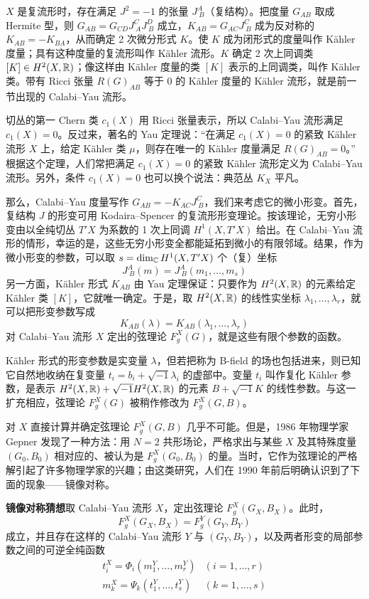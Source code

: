 $X$ 是复流形时，存在满足 $J^2=-1$ 的张量 $J^A_{\ B}$（复结构）。把度量 $G_{AB}$ 取成 Hermite 型，则 $G_{AB}=G_{CD}J^C_{\ A}J^D_{\ B}$ 成立，$K_{AB}=G_{AC}J^C_{\ B}$ 成为反对称的 $K_{AB}=-K_{BA}$，从而确定 2 次微分形式 $K$。使 $K$ 成为闭形式的度量叫作 Kähler 度量；具有这种度量的复流形叫作 Kähler 流形。$K$ 确定 2 次上同调类 $[K]\in H^2(X,\mathbb{R})$；像这样由 Kähler 度量的类 $[K]$ 表示的上同调类，叫作 Kähler 类。带有 Ricci 张量 $R(G)_{AB}$ 等于 0 的 Kähler 度量的 Kähler 流形，就是前一节出现的 Calabi--Yau 流形。

切丛的第一 Chern 类 $c_1(X)$ 用 Ricci 张量表示，所以 Calabi--Yau 流形满足 $c_1(X)=0$。反过来，著名的 Yau 定理说：“在满足 $c_1(X)=0$ 的紧致 Kähler 流形 $X$ 上，给定 Kähler 类 $\mu$，则存在唯一的 Kähler 度量满足 $R(G)_{AB}=0$。”
根据这个定理，人们常把满足 $c_1(X)=0$ 的紧致 Kähler 流形定义为 Calabi--Yau 流形。另外，条件 $c_1(X)=0$ 也可以换个说法：典范丛 $K_X$ 平凡。

那么，Calabi--Yau 度量写作 $G_{AB}=-K_{AC}J^C_{\ B}$，我们来考虑它的微小形变。首先，复结构 $J$ 的形变可用 Kodaira--Spencer 的复流形形变理论。按该理论，无穷小形变由以全纯切丛 $T'X$ 为系数的 1 次上同调 $H^1(X,T'X)$ 给出。在 Calabi--Yau 流形的情形，幸运的是，这些无穷小形变全都能延拓到微小的有限邻域。结果，作为微小形变的参数，可以取 $s=\dim_{\mathbb{C}}H^1(X,T'X)$ 个（复）坐标
\[
  J^A_{\ B}(m)=J^A_{\ B}(m_1,\dots,m_s)
\]
另一方面，Kähler 形式 $K_{AB}$ 由 Yau 定理保证：只要作为 $H^2(X,\mathbb{R})$ 的元素给定 Kähler 类 $[K]$，它就唯一确定。于是，取 $H^2(X,\mathbb{R})$ 的线性实坐标 $\lambda_1,\dots,\lambda_r$，就可以把形变参数写成
\[
  K_{AB}(\lambda)=K_{AB}(\lambda_1,\dots,\lambda_r)
\]
对 Calabi--Yau 流形 $X$ 定出的弦理论 $F_g^X(G)$，就是这些有限个参数的函数。

Kähler 形式的形变参数是实变量 $\lambda$，但若把称为 B-field 的场也包括进来，则已知它自然地收纳在复变量 $t_i=b_i+\sqrt{-1}\lambda_i$ 的虚部中。变量 $t_i$ 叫作复化 Kähler 参数，是表示 $H^2(X,\mathbb{R})+\sqrt{-1}H^2(X,\mathbb{R})$ 的元素 $B+\sqrt{-1}K$ 的线性参数。与这一扩充相应，弦理论 $F_g^X(G)$ 被稍作修改为 $F_g^X(G,B)$。

对 $X$ 直接计算并确定弦理论 $F_g^X(G,B)$ 几乎不可能。但是，1986 年物理学家 Gepner 发现了一种方法：用 $N=2$ 共形场论，严格求出与某些 $X$ 及其特殊度量 $(G_0,B_0)$ 相对应的、被认为是 $F_g^X(G_0,B_0)$ 的量。当时，它作为弦理论的严格解引起了许多物理学家的兴趣；由这类研究，人们在 1990 年前后明确认识到了下面的现象——镜像对称。

\noindent\textbf{镜像对称猜想}\quad 取 Calabi--Yau 流形 $X$，定出弦理论 $F_g^X(G_X,B_X)$。此时，
\begin{equation}
  F_g^X(G_X,B_X)=F_g^Y(G_Y,B_Y)
  \tag{4}
\end{equation}
成立，并且存在这样的 Calabi--Yau 流形 $Y$ 与 $(G_Y,B_Y)$，以及两者形变的局部参数之间的可逆全纯函数
\begin{equation}
\begin{array}{ll}
  t_i^X=\Phi_i(m_1^Y,\dots,m_r^Y) & (i=1,\dots,r)\\[2pt]
  m_k^X=\Psi_k(t_1^Y,\dots,t_s^Y) & (k=1,\dots,s)
\end{array}
\tag{5}
\end{equation}

